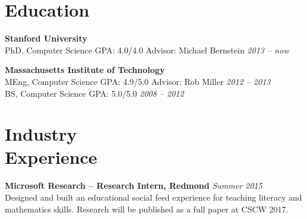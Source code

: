 \documentclass[margin,line]{resume}
\begin{document}
\vspace{-5.0mm}

\begin{resume}

\section{\mysidestyle Education}

\textbf{Stanford University} \vspace{0mm}\\\vspace{0mm}%
PhD, Computer Science  \hspace{2.5mm} GPA: 4.0/4.0 \hspace{30mm} Advisor: Michael Bernstein \hfill \textsl{2013 -- now}

\textbf{Massachusetts Institute of Technology} \vspace{0mm}\\\vspace{0mm}%
MEng, Computer Science \hspace{0mm} GPA: 4.9/5.0 \hspace{30mm} Advisor: Rob Miller \hfill \textsl{2012 -- 2013}\\\vspace{1mm}%
BS, Computer Science \hspace{4.5mm} GPA: 5.0/5.0 \hfill \textsl{2008 -- 2012}\vspace{-0.8mm}

\section{\mysidestyle Industry\\Experience}

\textbf{Microsoft Research -- Research Intern, Redmond} \hfill \textsl{Summer 2015}\\
Designed and built an educational social feed experience for teaching literacy and mathematics skills. Research will be published as a full paper at CSCW 2017.


\end{resume}
\end{document}
